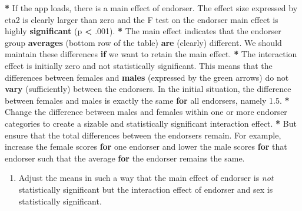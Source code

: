 \documentclass[a4paper]{book}
\newenvironment{Shaded}{\begin{snugshade}}{\end{snugshade}}
\newcommand{\KeywordTok}[1]{\textcolor[rgb]{0,0,0}{\textbf{#1}}}
\newcommand{\DecValTok}[1]{\textcolor[rgb]{0.00,0.00,0.00}{#1}}
\newcommand{\FloatTok}[1]{\textcolor[rgb]{0.00,0.00,0.00}{#1}}
\newcommand{\StringTok}[1]{\textcolor[rgb]{0.00,0.00,0.00}{#1}}
\newcommand{\ControlFlowTok}[1]{\textcolor[rgb]{0.00,0.00,0.00}{\textbf{#1}}}
\newcommand{\OperatorTok}[1]{\textcolor[rgb]{0.00,0.00,0.00}{\textbf{#1}}}
\newcommand{\NormalTok}[1]{#1}
\providecommand{\tightlist}{%
  \setlength{\itemsep}{0pt}\setlength{\parskip}{0pt}}
\theoremstyle{definition}
\theoremstyle{definition}
\theoremstyle{definition}
\theoremstyle{remark}
\begin{document}
\begin{Shaded}
\begin{Highlighting}[]
\OperatorTok{*}\StringTok{ }\NormalTok{If the app loads, there is a main effect of endorser. The effect size}
\NormalTok{expressed by eta2 is clearly larger than zero and the F test on the endorser}
\NormalTok{main effect is highly }\KeywordTok{significant}\NormalTok{ (p }\OperatorTok{<}\StringTok{ }\NormalTok{.}\DecValTok{001}\NormalTok{).}
\OperatorTok{*}\StringTok{ }\NormalTok{The main effect indicates that the endorser group }\KeywordTok{averages}\NormalTok{ (bottom row of the}
\NormalTok{table) }\KeywordTok{are}\NormalTok{ (clearly) different. We should maintain these differences }\ControlFlowTok{if}\NormalTok{ we}
\NormalTok{want to retain the main effect.}
\OperatorTok{*}\StringTok{ }\NormalTok{The interaction effect is initially zero and not statistically significant.}
\NormalTok{This means that the differences between females and }\KeywordTok{males}\NormalTok{ (expressed by the}
\NormalTok{green arrows) do not }\KeywordTok{vary}\NormalTok{ (sufficiently) between the endorsers. In the initial}
\NormalTok{situation, the difference between females and males is exactly the same }\ControlFlowTok{for}
\NormalTok{all endorsers, namely }\FloatTok{1.5}\NormalTok{.}
\OperatorTok{*}\StringTok{ }\NormalTok{Change the difference between males and females within one or more endorser}
\NormalTok{categories to create a sizable and statistically significant interaction}
\NormalTok{effect.}
\OperatorTok{*}\StringTok{ }\NormalTok{But ensure that the total differences between the endorsers remain. For}
\NormalTok{example, increase the female scores }\ControlFlowTok{for}\NormalTok{ one endorser and lower the male scores}
\ControlFlowTok{for}\NormalTok{ that endorser such that the average }\ControlFlowTok{for}\NormalTok{ the endorser remains the same.}
\end{Highlighting}
\end{Shaded}

\begin{enumerate}
\def\labelenumi{\arabic{enumi}.}
\setcounter{enumi}{1}
\tightlist
\item
  Adjust the means in such a way that the main effect of endorser is
  \emph{not} statistically significant but the interaction effect of
  endorser and sex is statistically significant.
\end{enumerate}
\end{document}
